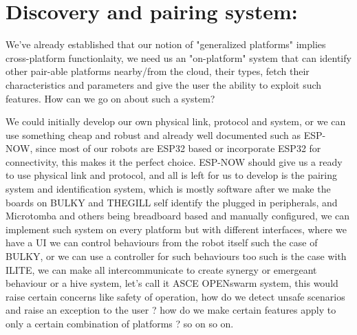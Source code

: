 \chapter{Discovery and pairing system:}
\label{chap:discovery}

We've already established that our notion of "generalized platforms" implies cross-platform functionlaity, we need us an "on-platform" system that can identify other pair-able platforms nearby/from the cloud, their types, fetch their characteristics and parameters and give the user the ability to exploit such features. How can we go on about such a system?

We could initially develop our own physical link, protocol and system, or we can use something cheap and robust and already well documented such as ESP-NOW, since most of our robots are ESP32 based or incorporate ESP32 for connectivity, this makes it the perfect choice. ESP-NOW should give us a ready to use physical link and protocol, and all is left for us to develop is the pairing system and identification system, which is mostly software after we make the boards on BULKY and THEGILL self identify the plugged in peripherals, and Microtomba and others being breadboard based and manually configured, we can implement such system on every platform but with different interfaces, where we have a UI we can control behaviours from the robot itself such the case of BULKY, or we can use a controller for such behaviours too such is the case with ILITE, we can make all intercommunicate to create synergy or emergeant behaviour or a hive system, let's call it ASCE OPENswarm system, this would raise certain concerns like safety of operation, how do we detect unsafe scenarios and raise an exception to the user ? how do we make certain features apply to only a certain combination of platforms ? so on so on.

